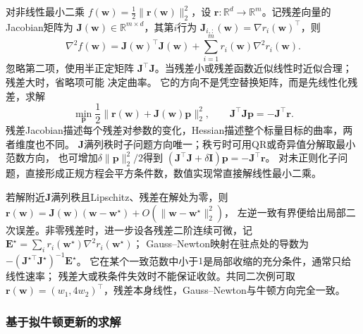 对非线性最小二乘
$f(\bm{w})=\frac12\lVert\bm{r}(\bm{w})\rVert_2^2$，设
$\bm{r}:\mathbb{R}^d\to\mathbb{R}^m$。记残差向量的Jacobian矩阵为
$\bm{J}(\bm{w})\in\mathbb{R}^{m\times d}$，其第$i$行为
$\bm{J}_{i,:}(\bm{w})=\nabla r_i(\bm{w})^{\top}$，则
\[
  \nabla^2f(\bm{w})
  =\bm{J}(\bm{w})^{\top}\bm{J}(\bm{w})
  +\sum_{i=1}^m r_i(\bm{w})\nabla^2r_i(\bm{w}).
\]
忽略第二项，使用半正定矩阵
$\bm{J}^{\top}\bm{J}$。当残差小或残差函数近似线性时近似合理；残差大时，省略项可能
决定曲率。
它的方向不是凭空替换矩阵，而是先线性化残差，求解
\[
 \min_{\bm p}\frac12\|\bm r(\bm w)+\bm J(\bm w)\bm p\|_2^2,
 \qquad
 \bm J^\top\bm J\bm p=-\bm J^\top\bm r.
\]
残差Jacobian描述每个残差对参数的变化，Hessian描述整个标量目标的曲率，两者维度也不同。
$\bm J$满列秩时子问题方向唯一；秩亏时可用QR或奇异值分解取最小范数方向，
也可增加$\delta\|\bm p\|_2^2/2$得到
$(\bm J^\top\bm J+\delta\bm I)\bm p=-\bm J^\top\bm r$。
对未正则化子问题，直接形成正规方程会平方条件数，数值实现常直接解线性最小二乘。

若解附近$\bm J$满列秩且Lipschitz、残差在解处为零，则
$\bm r(\bm w)=\bm J(\bm w)(\bm w-\bm w^\star)+O(\|\bm w-\bm w^\star\|_2^2)$，
左逆一致有界便给出局部二次误差。非零残差时，进一步设各残差二阶连续可微，记
$\bm E^\star=\sum_i r_i(\bm w^\star)\nabla^2r_i(\bm w^\star)$；
Gauss--Newton映射在驻点处的导数为
$-(\bm J^{\star\top}\bm J^\star)^{-1}\bm E^\star$。
它在某个一致范数中小于$1$是局部收缩的充分条件，通常只给线性速率；
残差大或秩条件失效时不能保证收敛。共同二次例可取
$\bm r(\bm w)=(w_1,4w_2)^\top$，残差本身线性，Gauss--Newton与牛顿方向完全一致。

\subsubsection{基于拟牛顿更新的求解}
\label{sec:opt-quasi-newton}

